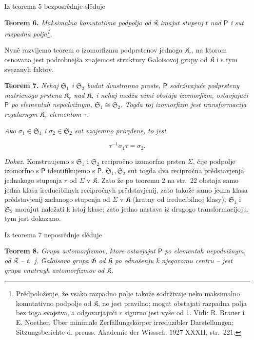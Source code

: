 \documentclass[11pt]{article}
\newcommand{\srcfn}[2]{\footnote{#2}}
\newcommand{\foreign}[1]{#1}
\begin{document}
Iz teorema 5 bezposrědnje slěduje

\textbf{Teorem 6.} \emph{Maksimalna komutativna podpolja od \(\mathfrak K\) imajut stupenj \(t\) nad \(\mathsf P\) i sut razpadna polja\srcfn{1}{Prědpoloženje, že vsako razpadno polje takože sodrživaje neko maksimalno komutativno podpolje od \(\mathfrak K\), ne jest pravilno; mogut obstajati razpadna polja bez toga svojstva, a odgovarjajuči \(r\) sigurno jest vyše od 1. Vidi: \foreign{R. Brauer} i \foreign{E. Noether}, \foreign{Über minimale Zerfällungskörper irreduzibler Darstellungen; Sitzungsberichte d. preuss. Akademie der Wisssch. 1927 XXXII, str.~221.}}.}

Nyně razvijemo teorem o izomorfizmu podprstenov jednogo \(\mathfrak K_r\), na ktorom osnovana jest podrobnėjša znajemost struktury Galoisovoj grupy od \(\mathfrak K\) i s tym svęzanyh faktov.

\textbf{Teorem 7.} \emph{Nehaj \(\mathfrak S_1\) i \(\mathfrak S_2\) budut dvustranno proste, \(\mathsf P\) sodrživajuće podprsteny matricnogo prstena \(\mathfrak K_r\) nad \(\mathfrak K\), i nehaj medžu nimi obstaja izomorfizm, ostavjajuči \(\mathsf P\) po elementah nepodvižnym, \(\mathfrak S_1\cong\mathfrak S_2\). Togda toj izomorfizm jest transformacija regularnym \(\mathfrak K_r\)-elementom \(\tau\).}

\emph{Ako \(\sigma_1\in\mathfrak S_1\) i \(\sigma_2\in\mathfrak S_2\) sut vzajemno priręđene, to jest}

\[
\tau^{-1}\sigma_1\tau=\sigma_2.
\]

\emph{Dokaz.} Konstruujemo s \(\mathfrak S_1\) i \(\mathfrak S_2\) recipročno izomorfno prsten \(\Sigma\), čije podpolje izomorfno s \(\mathsf P\) identifikujemo s \(\mathsf P\). \(\mathfrak S_1,\mathfrak S_2\) sut togda dva recipročna prědstavjenja jednakogo stupenja \(r\) od \(\Sigma\) v \(\mathfrak K\). Zato že po teoremu 2 na str.~22 obstaja samo jedna klasa ireducibilnyh recipročnyh prědstavjenij, zato takože samo jedna klasa prědstavjenij zadanogo stupenja od \(\Sigma\) v \(\mathfrak K\) (kratny od ireducibilnoj klasy), \(\mathfrak S_1\) i \(\mathfrak S_2\) morajut naležati k istoj klase; zato jedno nastava iz drugogo transformacijoju, tym jest dokazano.

Iz teorema 7 neposrědnje slěduje

\textbf{Teorem 8.} \emph{Grupa avtomorfizmov, ktore ostavjajut \(\mathsf P\) po elementah nepodvižnym, od \(\mathfrak K\) -- t.~j. Galoisova grupa \(\mathfrak G\) od \(\mathfrak K\) po odnošenju k njegovomu centru -- jest grupa vnutrnyh avtomorfizmov od \(\mathfrak K\).}
\end{document}
